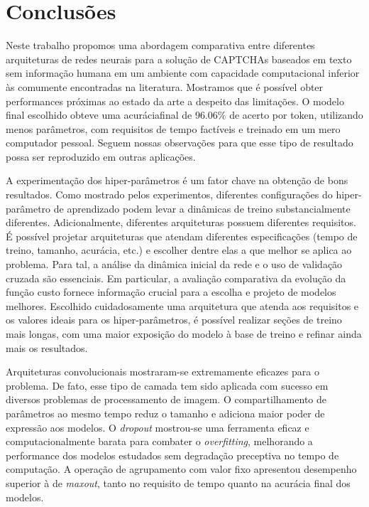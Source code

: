 \chapter{Conclusões}

Neste trabalho propomos uma abordagem comparativa entre diferentes arquiteturas de redes neurais para a solução de CAPTCHAs baseados em texto sem informação humana em um ambiente com capacidade computacional inferior às comumente encontradas na literatura. Mostramos que é possível obter performances próximas ao estado da arte a despeito das limitações. O modelo final escolhido obteve uma acuráciafinal de $96.06\%$ de acerto por token, utilizando menos parâmetros, com requisitos de tempo factíveis e treinado em um mero computador pessoal. Seguem nossas observações para que esse tipo de resultado possa ser reproduzido em outras aplicações.

A experimentação dos hiper-parâmetros é um fator chave na obtenção de bons resultados. Como mostrado pelos experimentos, diferentes configurações do hiper-parâmetro de aprendizado podem levar a dinâmicas de treino substancialmente diferentes. Adicionalmente, diferentes arquiteturas possuem diferentes requisitos. É possível projetar arquiteturas que atendam diferentes especificações (tempo de treino, tamanho, acurácia, etc.) e escolher dentre elas a que melhor se aplica ao problema. Para tal, a análise da dinâmica inicial da rede e o uso de validação cruzada são essenciais. Em particular, a avaliação comparativa da evolução da função custo fornece informação crucial para a escolha e projeto de modelos melhores. Escolhido cuidadosamente uma arquitetura que atenda aos requisitos e os valores ideais para os hiper-parâmetros, é possível realizar seções de treino mais longas, com uma maior exposição do modelo à base de treino e refinar ainda mais os resultados. 

Arquiteturas convolucionais mostraram-se extremamente eficazes para o problema. De fato, esse tipo de camada tem sido aplicada com sucesso em diversos problemas de processamento de imagem. O compartilhamento de parâmetros ao mesmo tempo reduz o tamanho e adiciona maior poder de expressão aos modelos. O \textit{dropout} mostrou-se uma ferramenta eficaz e computacionalmente barata para combater o \textit{overfitting}, melhorando a performance dos modelos estudados sem degradação preceptiva no tempo de computação. A operação de agrupamento com valor fixo apresentou desempenho superior à de \textit{maxout}, tanto no requisito de tempo quanto na acurácia final dos modelos.

